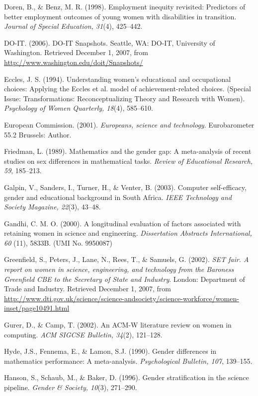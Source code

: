 \documentclass[11.5pt]{sig-alternate} %
\begin{document}
Doren, B., \& Benz, M. R. (1998). Employment inequity revisited: Predictors of better employment outcomes of young women with disabilities in transition. \textit{Journal of Special Education, 31}(4), 425–442. 
 
DO-IT. (2006). DO-IT Snapshots. Seattle, WA: DO-IT, University of Washington. Retrieved December 1, 2007, from \url{http://www.washington.edu/doit/Snapshots/}
 
Eccles, J. S. (1994). Understanding women's educational and occupational choices: Applying the Eccles et al. model of achievement-related choices. (Special Issue: Transformations: Reconceptualizing Theory and Research with Women). \textit{Psychology of Women Quarterly, 18}(4), 585–610. 
 
European Commission. (2001). \textit{Europeans, science and technology}. Eurobarometer 55.2 Brussels: Author.  

Friedman, L. (1989). Mathematics and the gender gap: A meta-analysis of recent studies on sex differences in mathematical tasks. \textit{Review of Educational Research, 59}, 185–213. 
 
Galpin, V., Sanders, I., Turner, H., \& Venter, B. (2003). Computer self-efficacy, gender and educational background in South Africa. \textit{IEEE Technology and Society Magazine, 22}(3), 43–48. 
 
Gandhi, C. M. O. (2000). A longitudinal evaluation of factors associated with retaining women in science and engineering. \textit{Dissertation Abstracts International, 60} (11), 5833B. (UMI No. 9950087) 
 
Greenfield, S., Peters, J., Lane, N., Rees, T., \& Samuels, G. (2002). \textit{SET fair. A report on women in science, engineering, and technology from the Baroness Greenfield CBE to the Secretary of State and Industry}. London: Department of Trade and Industry. Retrieved December 1, 2007, from \url{http://www.dti.gov.uk/science/science-andsociety/science-workforce/women-inset/page10491.html} 
 
Gurer, D., \& Camp, T. (2002). An ACM-W literature review on women in computing. \textit{ACM SIGCSE Bulletin, 34}(2), 121–128.  
 
Hyde, J.S., Fennema, E., \& Lamon, S.J. (1990). Gender differences in mathematics performance: A meta-analysis. \textit{Psychological Bulletin, 107}, 139–155. 
 
Hanson, S., Schaub, M., \& Baker, D. (1996). Gender stratification in the science pipeline. \textit{Gender \& Society, 10}(3), 271–290. 
 
\end{document}
